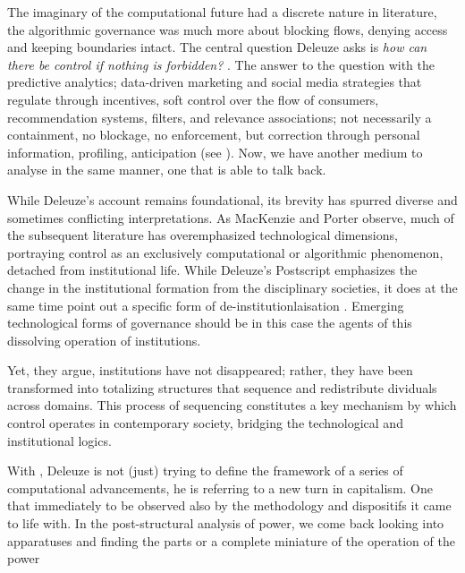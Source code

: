 The imaginary of the computational future had a discrete nature in literature, the
algorithmic governance was much more about blocking flows, denying access and
keeping boundaries intact. The central question Deleuze asks is \textit{how can
	there be control if nothing is forbidden?} \parencite[2]{brusseau2020}. The
answer to the question with the predictive analytics; data-driven marketing and social media strategies that regulate through incentives, soft control over the flow of consumers, recommendation systems, filters, and relevance associations; not necessarily a containment, no blockage, no enforcement, but correction through personal information, profiling, anticipation (see \cite[2]{brusseau2020}). Now, we have another medium to analyse in the same manner, one that is able to talk back.


While Deleuze's account remains foundational, its brevity has spurred diverse and sometimes conflicting interpretations. As MacKenzie and Porter \parencite*{mackenzie2021} observe, much of the subsequent literature has overemphasized technological dimensions, portraying control as an exclusively computational or algorithmic phenomenon, detached from institutional life.
While Deleuze's Postscript emphasizes the change in the institutional formation
from the disciplinary societies, it does at the same time point out a specific
form of de-institutionlaisation \parencite[15]{mackenzie2021}. Emerging
technological forms of governance should be in this case the agents of this
dissolving operation of institutions.

\begin{orangebox}


	Yet, they argue, institutions have not disappeared; rather, they have been transformed into totalizing structures that sequence and redistribute dividuals across domains. This process of sequencing constitutes a key mechanism by which control operates in contemporary society, bridging the technological and institutional logics.

\end{orangebox}

With , Deleuze is not (just) trying to define the
framework of a series of computational advancements, he is referring to a new
turn in capitalism. One that immediately to be observed also by the methodology
and dispositifs it came to life with. In the post-structural analysis of
power, we come back looking into apparatuses and finding the parts or a
complete miniature of the operation of the power

